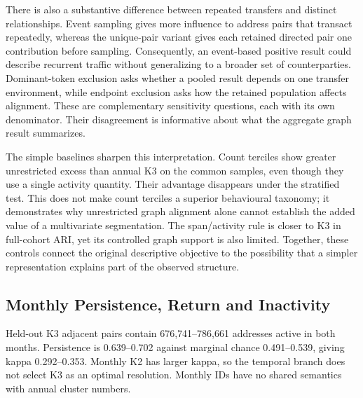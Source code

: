 \documentclass[journal,letterpaper]{IEEEtran}
\begin{document}
There is also a substantive difference between repeated transfers and distinct relationships. Event sampling gives more influence to address pairs that transact repeatedly, whereas the unique-pair variant gives each retained directed pair one contribution before sampling. Consequently, an event-based positive result could describe recurrent traffic without generalizing to a broader set of counterparties. Dominant-token exclusion asks whether a pooled result depends on one transfer environment, while endpoint exclusion asks how the retained population affects alignment. These are complementary sensitivity questions, each with its own denominator. Their disagreement is informative about what the aggregate graph result summarizes.

The simple baselines sharpen this interpretation. Count terciles show greater unrestricted excess than annual K3 on the common samples, even though they use a single activity quantity. Their advantage disappears under the stratified test. This does not make count terciles a superior behavioural taxonomy; it demonstrates why unrestricted graph alignment alone cannot establish the added value of a multivariate segmentation. The span/activity rule is closer to K3 in full-cohort ARI, yet its controlled graph support is also limited. Together, these controls connect the original descriptive objective to the possibility that a simpler representation explains part of the observed structure.

\subsection{Monthly Persistence, Return and Inactivity}
Held-out K3 adjacent pairs contain 676,741--786,661 addresses active in both months. Persistence is 0.639--0.702 against marginal chance 0.491--0.539, giving kappa 0.292--0.353. Monthly K2 has larger kappa, so the temporal branch does not select K3 as an optimal resolution. Monthly IDs have no shared semantics with annual cluster numbers.
\end{document}
